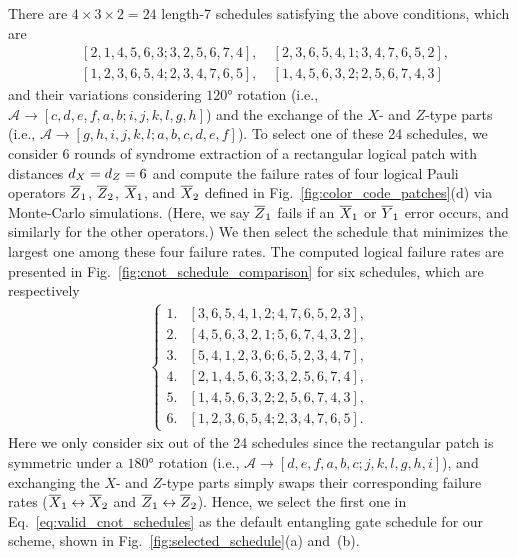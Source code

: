 \documentclass[
 prx,
 reprint,
 superscriptaddress,
 longbibliography,
 dvipsnames
]{revtex4-2}
\begin{document}
There are $4 \times 3 \times 2 = 24$ length-7 schedules satisfying the above conditions, which are
\begin{align*}
    &[2, 1, 4, 5, 6, 3; 3, 2, 5, 6, 7, 4], \quad [2, 3, 6, 5, 4, 1; 3, 4, 7, 6, 5, 2],\\
    &[1, 2, 3, 6, 5, 4; 2, 3, 4, 7, 6, 5], \quad[1, 4, 5, 6, 3, 2; 2, 5, 6, 7, 4, 3]
\end{align*}
and their variations considering $\ang{120}$ rotation (i.e., $\mathcal{A} \rightarrow [c, d, e, f, a, b; i, j, k, l, g, h]$) and the exchange of the $X$- and $Z$-type parts (i.e., $\mathcal{A} \rightarrow [g, h, i, j, k, l; a, b, c, d, e, f]$).
To select one of these 24 schedules, we consider 6 rounds of syndrome extraction of a rectangular logical patch with distances ${d_X} = {d_Z} = 6$ and compute the failure rates of four logical Pauli operators $\overline{Z}_1$, $\overline{Z}_2$, $\overline{X}_1$, and $\overline{X}_2$ defined in Fig.~\ref{fig:color_code_patches}(d) via Monte-Carlo simulations.
(Here, we say $\overline{Z}_1$ fails if an $\overline{X}_1$ or $\overline{Y}_1$ error occurs, and similarly for the other operators.)
We then select the schedule that minimizes the largest one among these four failure rates.
The computed logical failure rates are presented in Fig.~\ref{fig:cnot_schedule_comparison} for six schedules, which are respectively
\begin{align}
\begin{cases}
    1. &[3, 6, 5, 4, 1, 2; 4, 7, 6, 5, 2, 3], \\
    2. &[4, 5, 6, 3, 2, 1; 5, 6, 7, 4, 3, 2], \\
    3. &[5, 4, 1, 2, 3, 6; 6, 5, 2, 3, 4, 7], \\
    4. &[2, 1, 4, 5, 6, 3; 3, 2, 5, 6, 7, 4], \\
    5. &[1, 4, 5, 6, 3, 2; 2, 5, 6, 7, 4, 3], \\
    6. &[1, 2, 3, 6, 5, 4; 2, 3, 4, 7, 6, 5].
\end{cases}
\label{eq:valid_cnot_schedules}
\end{align}
Here we only consider six out of the 24 schedules since the rectangular patch is symmetric under a $\ang{180}$ rotation (i.e., $\mathcal{A} \rightarrow [d,e,f,a,b,c; j,k,l,g,h,i]$), and exchanging the $X$- and $Z$-type parts simply swaps their corresponding failure rates ($\overline{X}_1 \leftrightarrow \overline{X}_2$ and $\overline{Z}_1 \leftrightarrow \overline{Z}_2$).
Hence, we select the first one in Eq.~\eqref{eq:valid_cnot_schedules} as the default entangling gate schedule for our scheme, shown in Fig.~\ref{fig:selected_schedule}(a) and~(b).
\end{document}
